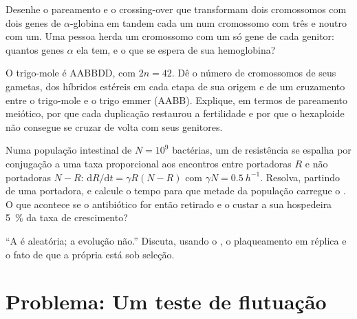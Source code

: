 \begin{exercise}[$\star\star$]\label{exo:b2:genome-diversification:9}
Desenhe o pareamento e o crossing-over que transformam dois
cromossomos com dois genes de $\alpha$-globina em tandem cada um num
cromossomo com três e noutro com um. Uma pessoa herda um cromossomo
com um só gene de cada genitor: quantos genes $\alpha$ ela tem, e o
que se espera de sua hemoglobina?
\end{exercise}

\begin{exercise}[$\star\star\star$]\label{exo:b2:genome-diversification:10}
O trigo-mole é AABBDD, com $2n = 42$. Dê o número de cromossomos de
seus gametas, dos híbridos estéreis em cada etapa de sua origem e de
um cruzamento entre o trigo-mole e o trigo emmer (AABB). Explique, em
termos de pareamento meiótico, por que cada duplicação restaurou a
fertilidade e por que o hexaploide não consegue se cruzar de volta com
seus genitores.
\end{exercise}

\begin{exercise}[$\star\star\star$]\label{exo:b2:genome-diversification:11}
Numa população intestinal de $N = 10^{9}$ bactérias, um  de
resistência se espalha por conjugação a uma taxa proporcional aos
encontros entre portadoras $R$ e não portadoras $N - R$:
$\mathrm{d}R/\mathrm{d}t =
\gamma R (N - R)$ com $\gamma N = \qty{0.5}{h^{-1}}$. Resolva, partindo
de uma portadora, e calcule o tempo para que metade da população
carregue o . O que acontece se o antibiótico for então
retirado e o  custar a sua hospedeira \qty{5}{\%} da taxa de
crescimento?
\end{exercise}

\begin{exercise}[$\star\star\star$]\label{exo:b2:genome-diversification:12}
``A  é aleatória; a evolução não.'' Discuta, usando o , o plaqueamento em réplica e o fato de que a própria  está sob seleção.
\end{exercise}

\section{Problema: Um teste de flutuação}


